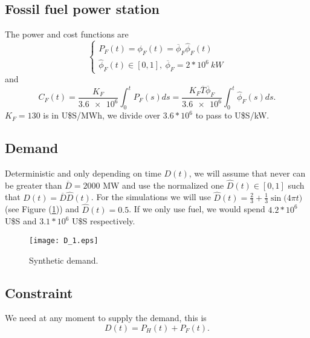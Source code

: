 \documentclass[12pt]{article}
\theoremstyle{definition}
\theoremstyle{remark}
\begin{document}
\subsection{Fossil fuel power station}

The power and cost functions are
\begin{equation*}
\begin{cases}
P_F(t)=\phi_F(t)=\overline{\phi}_F\hat{\phi}_F(t)\\
\hat{\phi}_F(t)\in[0,1],\ \overline{\phi}_F=2*10^6\ kW
\end{cases}
\end{equation*}
and
\begin{equation*}
C_F(t)=\frac{K_F}{\num{3.6e6}}\int_0^tP_F(s)ds=\frac{K_F\overline{T}\overline{\phi}_F}{\num{3.6e6}}\int_0^t\hat{\phi}_F(s)ds.
\end{equation*}
$K_F=130$ is in U\$S/MWh, we divide over $3.6*10^6$ to pass to U\$S/kW.

\subsection{Demand}

Deterministic and only depending on time $D(t)$, we will assume that never can be greater than $\overline{D}=2000$ MW and use the normalized one $\hat{D}(t)\in[0,1]$ such that $D(t)=\overline{D}\hat{D}(t)$. For the simulations we will use $\hat{D}(t)=\frac{2}{3}+\frac{1}{3}\sin\big(4\pi t\big)$ (see Figure (\ref{D_1})) and $\hat{D}(t)=0.5$. If we only use fuel, we would spend $4.2*10^6$ U\$S and  $3.1*10^6$ U\$S respectively.
\begin{figure}[ht!]
\centering
\texttt{[image: D\_1.eps]}
\caption{Synthetic demand.}
\label{D_1}
\end{figure}

\subsection{Constraint}

We need at any moment to supply the demand, this is
\begin{equation*}
D(t)=P_H(t)+P_F(t).
\end{equation*}
\end{document}
